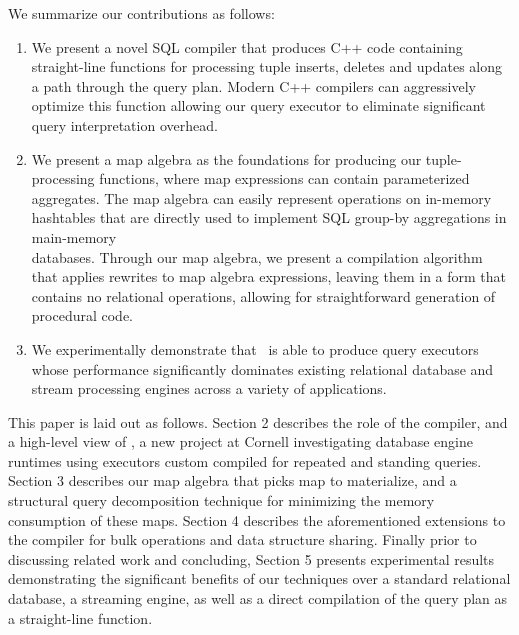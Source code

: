We summarize our contributions as follows:

\begin{enumerate}
  \item We present a novel SQL compiler that produces C++ code containing
  straight-line functions for processing tuple inserts, deletes and updates
  along a path through the query plan. Modern C++ compilers can aggressively
  optimize this function allowing our query executor to eliminate significant
  query interpretation overhead.
  \item We present a map algebra as the foundations for producing our
  tuple-processing functions, where map expressions can contain parameterized
  aggregates. The map algebra can easily represent operations on in-memory
  hashtables that are directly used to implement SQL group-by aggregations in
  main-memory\\databases. Through our map algebra, we present a compilation
  algorithm that applies rewrites to map algebra expressions, leaving them in a
  form that contains no relational operations, allowing for straightforward
  generation of procedural code.
  \item We experimentally demonstrate that \compiler\ is able to produce
  query executors whose performance significantly dominates existing relational
  database and stream processing engines across a variety of applications. 
\end{enumerate}


This paper is laid out as follows. Section 2 describes the role of the compiler,
and a high-level view of \compiler, a new project at Cornell investigating
database engine runtimes using executors custom compiled for repeated and
standing queries.
Section 3 describes our map algebra that picks map to materialize, and a
structural query decomposition technique for minimizing the memory consumption of
these maps. Section 4 describes the aforementioned extensions to the compiler
for bulk operations and data structure sharing. Finally prior to discussing
related work and concluding, Section 5 presents experimental results
demonstrating the significant benefits of our techniques over a standard
relational database, a streaming engine, as well as a direct compilation of the
query plan as a straight-line function.






